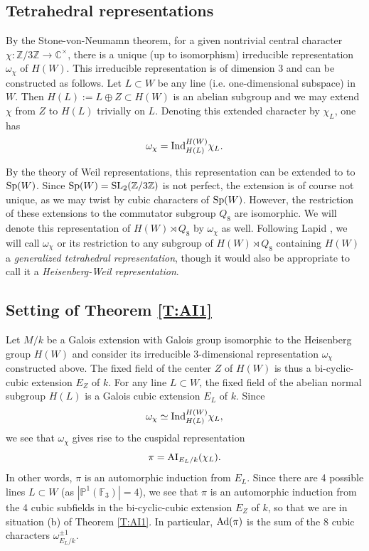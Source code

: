 \documentclass[11pt]{amsart}
\theoremstyle{plain}
\numberwithin{equation}{section}
\newcommand{\Z}{\mathbb Z}
\newcommand{\C}{\mathbb C}
\def\SL{{\rm SL}}
\def\Sp{{\rm Sp}}
\def\Sp{{\rm Sp}}
\def\Z{{\mathbb Z}}
\def\C{{\bf C}}
\def\C{{\mathbb C}}
\begin{document}
\vskip 5pt

\subsection{\bf Tetrahedral representations} \label{SS:tetra}
By the Stone-von-Neumamn theorem, for a given nontrivial central character $\chi: \Z/3\Z \rightarrow \C^{\times}$, there is a unique (up to isomorphism) irreducible representation $\omega_{\chi}$ of $H(W)$. 
This irreducible representation is of dimension $3$ and can be constructed as follows. Let $L \subset W$ be any line (i.e. one-dimensional subspace) in $W$. Then $H(L) := L \oplus Z \subset H(W)$ is an abelian subgroup and we may extend $\chi$ from $Z$ to $H(L)$
trivially on $L$. Denoting this extended character by $\chi_L$, one has 
\[ \omega_{\chi} = {\rm Ind}_{H(L)}^{H(W)} \chi_L. \]
\vskip 5pt

By the theory of Weil representations, this representation can be extended to 
to $\Sp(W)$.  Since $\Sp(W) = \SL_2(\Z/3\Z)$ is not perfect, the extension is of course not unique, as we may twist by cubic characters of $\Sp(W)$. However, the restriction of these extensions to the commutator subgroup $Q_8$   are isomorphic. We will denote this representation of $H(W) \rtimes Q_8$ by $\omega_{\chi}$ as well.
Following Lapid \cite[\S 5]{L2}, we will call $\omega_{\chi}$ or its restriction to any subgroup of $H(W) \rtimes Q_8$ containing $H(W)$  a {\it generalized tetrahedral  representation}, though it would also be appropriate to call it a {\it Heisenberg-Weil representation}. 

\vskip 5pt

\subsection{\bf Setting of Theorem \ref{T:AI1}}
Let $M/k$ be a Galois extension with Galois group isomorphic to the Heisenberg group $H(W)$ and consider its irreducible 3-dimensional representation $\omega_{\chi}$ constructed above. 
The fixed field of the center $Z$ of $H(W)$ is thus a bi-cyclic-cubic extension $E_Z$ of $k$. 
For any line $L \subset W$, the fixed field of the abelian normal subgroup $H(L)$ is a Galois cubic extension $E_L$ of $k$. Since 
\[  \omega_{\chi} \simeq {\rm Ind}_{H(L)}^{H(W)} \chi_L, \]
we see that $\omega_{\chi}$ gives rise to the cuspidal representation 
\[ \pi = {\rm AI}_{E_L/k}(\chi_L). \]
In other words, $\pi$ is an automorphic induction from $E_L$. Since there are 4 possible lines $L \subset W$ (as $|\mathbb{P}^1(\mathbb{F}_3)| =4$), we see that $\pi$ is an automorphic induction from the 4 cubic subfields in the bi-cyclic-cubic extension $E_Z$ of $k$, so that we are in situation (b) of Theorem \ref{T:AI1}. In particular, ${\rm Ad}(\pi)$ is the sum of the 8 cubic characters $\omega_{E_L/k}^{\pm 1}$.
\end{document}
